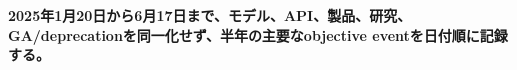 \noindent\textbf{2025年1月20日から6月17日まで、モデル、API、製品、研究、GA/deprecationを同一化せず、半年の主要なobjective eventを日付順に記録する。}\autocite{src-53f15d483a2d,src-8f8555b73e1b}
